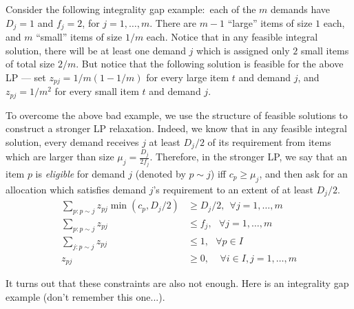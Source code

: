 Consider the following integrality gap example:~each of the $m$ demands have $D_j = 1$ and $f_j = 2$, for $j=1, \ldots, m$. There are $m-1$ ``large'' items of size $1$ each,
 and $m$ ``small'' items of size $1/m$ each. Notice that in any feasible integral solution, there will be at least one demand $j$ which is assigned only $2$ small items of total size $2/m$. But notice that the following solution is feasible for the above LP --- set $z_{pj} = 1/m (1-1/m)$ for every large item $t$ and demand $j$, and $z_{pj} = 1/m^2$ for every small item $t$ and demand $j$.

To overcome the above bad example, we use the structure of feasible solutions to construct a stronger LP relaxation. Indeed, we know that in any feasible integral solution, every demand receives $j$ at least $D_j/2$ of its requirement from items which are larger than size $\mu_j = \frac{D_j}{2f_j}$. Therefore, in the stronger LP, we say that an item $p$ is \emph{eligible} for demand $j$ (denoted by $p \sim j$) iff $c_p \geq \mu_j$, and then ask for an allocation which satisfies demand $j$'s requirement to an extent of at least $D_j/2$.
\begin{align*}
\sum_{p: p \sim j} z_{pj} \min(c_p, D_j/2) & \geq D_j/2, \ \  \forall j=1, \ldots, m \\
\sum_{p: p \sim j} z_{pj} & \leq f_j, \ \ \ \forall j = 1, \ldots, m \\
\sum_{j: p \sim j} z_{pj} & \leq 1,  \ \ \ \forall p \in I\\
z_{pj} & \geq 0, \ \ \ \ \ \forall i \in I,j=1, \ldots, m
\end{align*}

It turns out that these constraints are also not enough. Here is an integrality gap example (don't remember this one...).

\newcommand{\barD}{{\bar D}}

